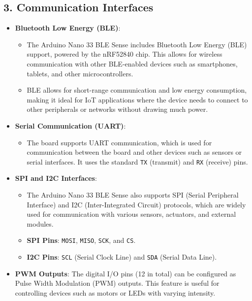 	\subsection*{3. Communication Interfaces}
	
	\begin{itemize}
		\item \textbf{Bluetooth Low Energy (BLE)}: 
		\begin{itemize}
			\item The Arduino Nano 33 BLE Sense includes Bluetooth Low Energy (BLE) support, powered by the nRF52840 chip. This allows for wireless communication with other BLE-enabled devices such as smartphones, tablets, and other microcontrollers.\cite{St:2024}
			\item BLE allows for short-range communication and low energy consumption, making it ideal for IoT applications where the device needs to connect to other peripherals or networks without drawing much power.\cite{St:2024}
		\end{itemize}
		
		\item \textbf{Serial Communication (UART)}:
		\begin{itemize}
			\item The board supports UART communication, which is used for communication between the board and other devices such as sensors or serial interfaces. It uses the standard \texttt{TX} (transmit) and \texttt{RX} (receive) pins.
		\end{itemize}
		
		\item \textbf{SPI and I2C Interfaces}: 
		\begin{itemize}
			\item The Arduino Nano 33 BLE Sense also supports SPI (Serial Peripheral Interface) and I2C (Inter-Integrated Circuit) protocols, which are widely used for communication with various sensors, actuators, and external modules.
			\item \textbf{SPI Pins}: \texttt{MOSI}, \texttt{MISO}, \texttt{SCK}, and \texttt{CS}.
			\item \textbf{I2C Pins}: \texttt{SCL} (Serial Clock Line) and \texttt{SDA} (Serial Data Line).
		\end{itemize}
		
		\item \textbf{PWM Outputs}: The digital I/O pins (12 in total) can be configured as Pulse Width Modulation (PWM) outputs. This feature is useful for controlling devices such as motors or LEDs with varying intensity.
	\end{itemize}
	
